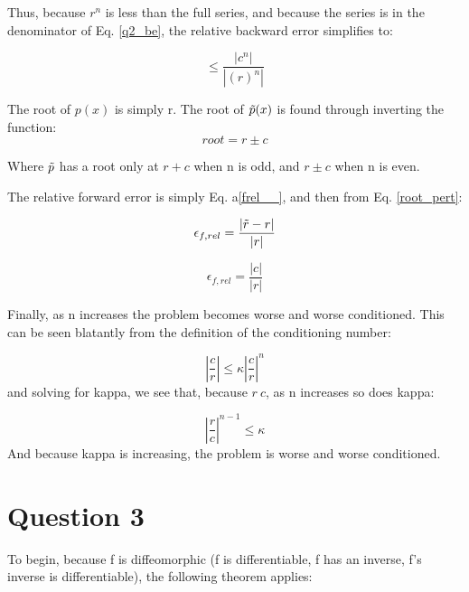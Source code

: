 \documentclass{article}
\begin{document}
Thus, because $r^n$ is less than the full series, and because the series is in the denominator of Eq. \ref{q2_be}, the relative backward error simplifies to:

\begin{equation}
    \leq \frac{|c^n|}{|(r)^n|}
\end{equation}



The root of $p(x)$ is simply r. The root of $\Tilde{p}(x)$ is found through inverting the function:
\begin{equation}
    root = r \pm c
    \label{root_pert}
\end{equation}

Where $\Tilde{p}$ has a root only at $r + c$ when n is odd, and $r \pm c$ when n is even. 

The relative forward error is simply Eq. a\ref{frel__}, and then from Eq. \ref{root_pert}:

\begin{equation}
    \epsilon_{f,rel} = \frac{|\Tilde{r}-r|}{|r|}
    \label{frel__}
\end{equation}



\begin{equation}
    \epsilon_{f,rel} = \frac{|c|}{|r|}
\end{equation}

Finally, as n increases the problem becomes worse and worse conditioned. 
This can be seen blatantly from the definition of the conditioning number:

\begin{equation}
    \left|\frac{c}{r}\right| \leq \kappa \left|\frac{c}{r}\right|^n
\end{equation}
and solving for kappa, we see that, because $r\>c$, as n increases so does kappa:

\begin{equation}
    \left| \frac{r}{c}\right|^{n-1} \leq \kappa
\end{equation}
And because kappa is increasing, the problem is worse and worse conditioned.



\section*{Question 3}

To begin, because f is diffeomorphic (f is differentiable, f has an inverse, f's inverse is differentiable), the following theorem applies: 
\end{document}
